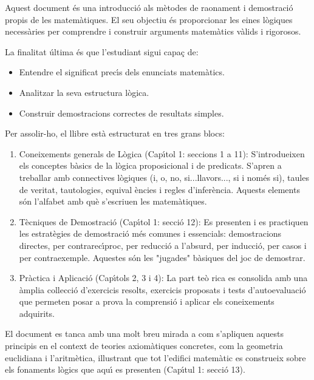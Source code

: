 \documentclass[12pt,a4paper,oneside]{book}
\theoremstyle{plain}
\theoremstyle{definition}
\theoremstyle{remark}
\numberwithin{equation}{section}
\begin{document}
Aquest document \'{e}s una introducci\'{o} als m\`{e}todes de raonament i
demostraci\'{o} propis de les matem\`{a}tiques. El seu objectiu \'{e}s
proporcionar les eines l\`{o}giques necess\`{a}ries per comprendre i
construir arguments matem\`{a}tics v\`{a}lids i rigorosos.

La finalitat \'{u}ltima \'{e}s que l'estudiant sigui capa\c{c} de:

\begin{itemize}
\item Entendre el significat prec\'{\i}s dels enunciats matem\`{a}tics.

\item Analitzar la seva estructura l\`{o}gica.

\item Construir demostracions correctes de resultats simples.
\end{itemize}

Per assolir-ho, el llibre est\`{a} estructurat en tres grans blocs:

\begin{enumerate}
\item Coneixements generals de L\`{o}gica (Cap\'{\i}tol 1: seccions 1 a 11):
S'introdueixen els conceptes b\`{a}sics de la l\`{o}gica proposicional i de
predicats. S'apren a treballar amb connectives l\`{o}giques (i, o, no,
si...llavors..., si i nom\'{e}s si), taules de veritat, tautologies, equival%
\`{e}ncies i regles d'infer\`{e}ncia. Aquests elements s\'{o}n l'alfabet amb
qu\`{e} s'escriuen les matem\`{a}tiques.

\item T\`{e}cniques de Demostraci\'{o} (Cap\'{\i}tol 1: secci\'{o} 12): Es
presenten i es practiquen les estrat\`{e}gies de demostraci\'{o} m\'{e}s
comunes i essencials: demostracions directes, per contrarec\'{\i}proc, per
reducci\'{o} a l'absurd, per inducci\'{o}, per casos i per contraexemple.
Aquestes s\'{o}n les "jugades" b\`{a}siques del joc de demostrar.

\item Pr\`{a}ctica i Aplicaci\'{o} (Cap\'{\i}tols 2, 3 i 4): La part te\`{o}%
rica es consolida amb una \`{a}mplia col\textperiodcentered lecci\'{o}
d'exercicis resolts, exercicis proposats i tests d'autoevaluaci\'{o} que
permeten posar a prova la comprensi\'{o} i aplicar els coneixements
adquirits.
\end{enumerate}

El document es tanca amb una molt breu mirada a com s'apliquen aquests
principis en el context de teories axiom\`{a}tiques concretes, com la
geometria euclidiana i l'aritm\`{e}tica, il\textperiodcentered lustrant que
tot l'edifici matem\`{a}tic es construeix sobre els fonaments l\`{o}gics que
aqu\'{\i} es presenten (Cap\'{\i}tul 1: secci\'{o} 13).
\end{document}
